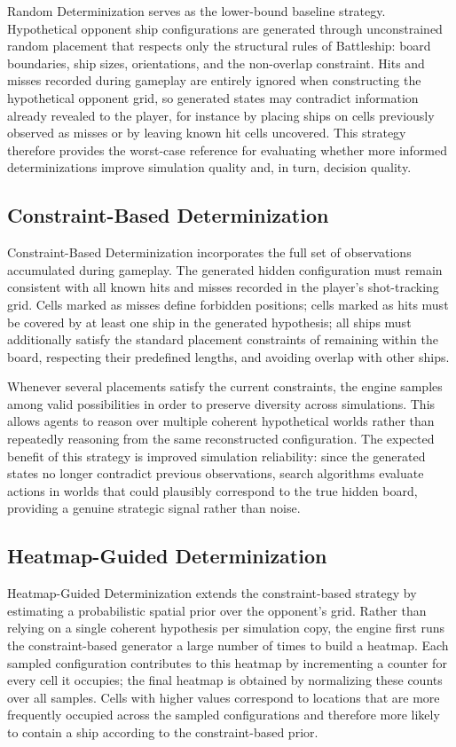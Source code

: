 Random Determinization serves as the lower-bound baseline strategy. Hypothetical opponent ship configurations are generated through unconstrained random placement that respects only the structural rules of Battleship: board boundaries, ship sizes, orientations, and the non-overlap constraint. Hits and misses recorded during gameplay are entirely ignored when constructing the hypothetical opponent grid, so generated states may contradict information already revealed to the player, for instance by placing ships on cells previously observed as misses or by leaving known hit cells uncovered. This strategy therefore provides the worst-case reference for evaluating whether more informed determinizations improve simulation quality and, in turn, decision quality.

\subsection{Constraint-Based Determinization}
\label{sec:csp_det}

Constraint-Based Determinization incorporates the full set of observations accumulated during gameplay. The generated hidden configuration must remain consistent with all known hits and misses recorded in the player's shot-tracking grid. Cells marked as misses define forbidden positions; cells marked as hits must be covered by at least one ship in the generated hypothesis; all ships must additionally satisfy the standard placement constraints of remaining within the board, respecting their predefined lengths, and avoiding overlap with other ships.

Whenever several placements satisfy the current constraints, the engine samples among valid possibilities in order to preserve diversity across simulations. This allows agents to reason over multiple coherent hypothetical worlds rather than repeatedly reasoning from the same reconstructed configuration. The expected benefit of this strategy is improved simulation reliability: since the generated states no longer contradict previous observations, search algorithms evaluate actions in worlds that could plausibly correspond to the true hidden board, providing a genuine strategic signal rather than noise.

\subsection{Heatmap-Guided Determinization}
\label{sec:heatmap_det}

Heatmap-Guided Determinization extends the constraint-based strategy by estimating a probabilistic spatial prior over the opponent's grid. Rather than relying on a single coherent hypothesis per simulation copy, the engine first runs the constraint-based generator a large number of times to build a heatmap. Each sampled configuration contributes to this heatmap by incrementing a counter for every cell it occupies; the final heatmap is obtained by normalizing these counts over all samples. Cells with higher values correspond to locations that are more frequently occupied across the sampled configurations and therefore more likely to contain a ship according to the constraint-based prior.

